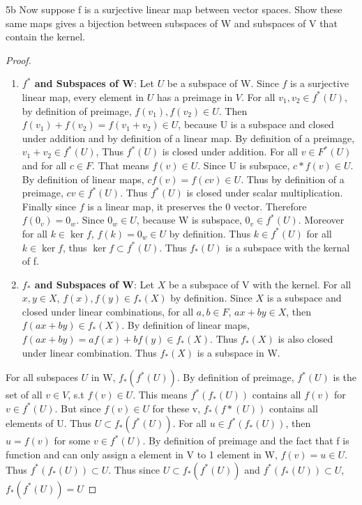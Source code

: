 \documentclass{article}
\begin{document}
\begin{claim}{5b}
	Now suppose f is a surjective linear map between vector spaces. Show these same maps gives a bijection between subspaces of W and subspaces of V that contain the kernel.
\end{claim}
\begin{proof}
	\begin{enumerate}{}
		\item \textbf{$f^*$ and Subspaces of W}: Let $U$ be a subspace of W. Since $f$ is a surjective linear map, every element in $U$ has a preimage in $V$. For all $v_1, v_2 \in f^*(U)$, by definition of preimage, $f(v_1), f(v_2) \in U$. Then $f(v_1) + f(v_2) = f(v_1 + v_2) \in U$, because U is a subspace and closed under addition and by definition of a linear map. By definition of a preimage, $v_1 + v_2 \in f^*(U)$, Thus $f^*(U)$ is closed under addition. For all $v \in F^*(U)$ and for all $c \in F$. That means $f(v) \in U$. Since U is subspace, $c*f(v) \in U$. By definition of linear maps, $cf(v) = f(cv) \in U$. Thus by definition of a preimage, $cv \in f^*(U)$. Thus $f^*(U)$ is closed under scalar multiplication. Finally since $f$ is a linear map, it preserves the 0 vector. Therefore $f(0_v) = 0_w$. Since $0_w \in U$, because W is subspace, $0_v \in f^*(U)$. Moreover for all $k \in \ker f$, $f(k) = 0_w \in U$ by definition. Thus $k \in f^*(U)$ for all $k \in \ker f$, thus $\ker f \subset f^*(U)$. Thus $f_*(U)$ is a subspace with the kernal of f.
		\item  \textbf{$f_*$ and Subspaces of W}: Let $X$ be a subspace of V with the kernel. For all $x, y \in X$, $f(x), f(y) \in f_*(X)$ by definition. Since $X$ is a subspace and closed under linear combinations, for all $a, b \in F$, $ax + by \in X$, then $f(ax + by) \in f_*(X)$. By definition of linear maps, $f(ax + by) = af(x) + bf(y) \in f_*(X)$. Thus $f_*(X)$ is also closed under linear combination. Thus $f_*(X)$ is a subspace in W. 
	\end{enumerate}

	For all subspaces $U$ in W, $f_*(f^*(U))$. By definition of preimage, $f^*(U)$ is the set of all $v \in V$, s.t $f(v) \in U$. This means $f^*(f_*(U))$ contains all $f(v)$ for $v \in f^*(U)$. But since $f(v) \in U$ for these v, $f_*(f*(U))$ contains all elements of U. Thus $U \subset f_*(f^*(U))$. For all $u \in f^*(f_*(U))$, then $u = f(v)$ for some $v \in f^*(U)$. By definition of preimage and the fact that f is function and can only assign a element in V to 1 element in W, $f(v) = u \in U$. Thus $f^*(f_*(U)) \subset U$. Thus since $U \subset f_*(f^*(U))$ and $f^*(f_*(U)) \subset U$, $f_*(f^*(U)) = U$


\end{proof}
\end{document}
